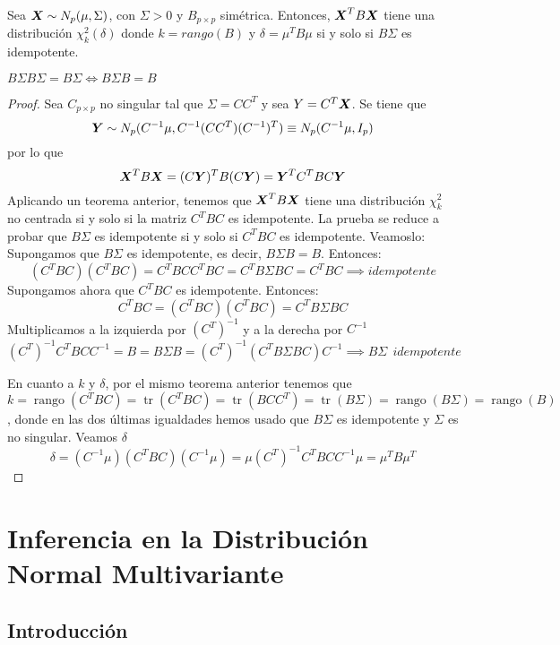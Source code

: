 \begin{nth}
  Sea $\boldsymbol{X} \sim N_p(\mu,\Sigma)$, con $\Sigma > 0$ y $B_{p\times p}$ simétrica. Entonces, $\boldsymbol{X}^T B \boldsymbol{X}$ tiene una distribución $\chi_k^2(\delta)$ donde $k = rango(B)$ y $\delta = \mu^T B \mu$ si y solo si $B\Sigma$ es idempotente.
  \begin{nota}
    $B\Sigma B\Sigma = B\Sigma \iff B\Sigma B = B$
  \end{nota}
\end{nth}
\begin{proof}
  Sea $C_{p\times p }$ no singular tal que $\Sigma = C C^T$ y sea $Y = C^T \boldsymbol{X}$. Se tiene que
  \[
  \boldsymbol{Y} \sim N_p(C^{-1}\mu, C^{-1}(CC^T)(C^{-1})^T) \equiv N_p(C^{-1}\mu, I_p)
  \]
  por lo que
  \[
  \boldsymbol{X}^T B \boldsymbol{X} = (C\boldsymbol{Y})^TB(C\boldsymbol{Y}) = \boldsymbol{Y}^T C^T B C \boldsymbol{Y}
  \]
  Aplicando un teorema anterior, tenemos que $\boldsymbol{X}^T B \boldsymbol{X}$ tiene una distribución $\chi^2_k$ no centrada si y solo si la matriz $C^T B C$ es idempotente. La prueba se reduce a probar que $B\Sigma$ es idempotente si y solo si $C^T B C$ es idempotente. Veamoslo:\\

  \boxed{\implies} Supongamos que $B\Sigma$ es idempotente, es decir, $B\Sigma B = B$. Entonces:
  \[
  (C^TBC)(C^TBC) = C^TBCC^TBC = C^TB\Sigma BC = C^TBC \implies idempotente
  \]
  \boxed{\impliedby} Supongamos ahora que $C^TBC$ es idempotente. Entonces:
  \[
  C^TBC = (C^TBC)(C^TBC) = C^TB\Sigma B C
  \]
  Multiplicamos a la izquierda por $(C^T)^{-1}$ y a la derecha por $C^{-1}$
  \[
  (C^T)^{-1}C^TBCC^{-1} = B = B\Sigma B = (C^T)^{-1}(C^T B \Sigma B C)C^{-1} \implies B \Sigma \ \ idempotente
  \]

  En cuanto a $k$ y $\delta$, por el mismo teorema anterior tenemos que
  \[
  k = \operatorname{rango}(C^T B C) = \operatorname{tr}(C^TBC) = \operatorname{tr}(BCC^T) = \operatorname{tr}(B\Sigma) = \operatorname{rango}(B\Sigma) = \operatorname{rango}(B)
  \], donde en las dos últimas igualdades hemos usado que $B\Sigma$ es idempotente y $\Sigma$ es no singular. Veamos $\delta$
  \[
  \delta = (C^{-1} \mu)(C^T B C)(C^{-1}\mu) = \mu(C^T)^{-1}C^T B CC^{-1}\mu = \mu^T B \mu^T
  \]
\end{proof}


\section{Inferencia en la Distribución Normal Multivariante}
\subsection{Introducción}

